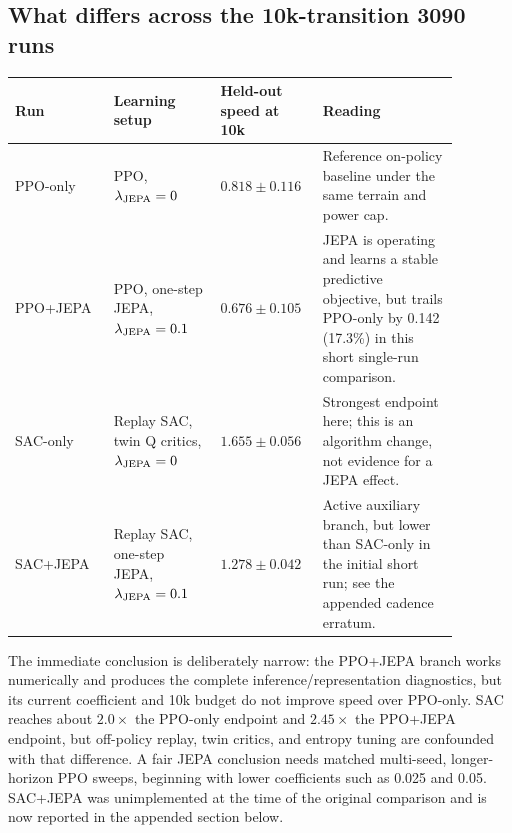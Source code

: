 \documentclass[10pt]{article}
\begin{document}
\subsection{What differs across the 10k-transition 3090 runs}
\begin{center}
\begin{tabular}{>{\raggedright\arraybackslash}p{0.20\linewidth}>{\raggedright\arraybackslash}p{0.22\linewidth}>{\raggedright\arraybackslash}p{0.18\linewidth}>{\raggedright\arraybackslash}p{0.28\linewidth}}
\toprule
\textbf{Run} & \textbf{Learning setup} & \textbf{Held-out speed at 10k} & \textbf{Reading}\tabularnewline
\midrule
PPO-only & PPO, $\lambda_{\rm JEPA}=0$ & $0.818\pm0.116$ & Reference on-policy baseline under the same terrain and power cap.\tabularnewline
PPO+JEPA & PPO, one-step JEPA, $\lambda_{\rm JEPA}=0.1$ & $0.676\pm0.105$ & JEPA is operating and learns a stable predictive objective, but trails PPO-only by 0.142 (17.3\%) in this short single-run comparison.\tabularnewline
SAC-only & Replay SAC, twin Q critics, $\lambda_{\rm JEPA}=0$ & $1.655\pm0.056$ & Strongest endpoint here; this is an algorithm change, not evidence for a JEPA effect.\tabularnewline
SAC+JEPA & Replay SAC, one-step JEPA, $\lambda_{\rm JEPA}=0.1$ & $1.278\pm0.042$ & Active auxiliary branch, but lower than SAC-only in the initial short run; see the appended cadence erratum.\tabularnewline
\bottomrule
\end{tabular}
\end{center}

The immediate conclusion is deliberately narrow: the PPO+JEPA branch works
numerically and produces the complete inference/representation diagnostics,
but its current coefficient and 10k budget do not improve speed over PPO-only.
SAC reaches about $2.0\times$ the PPO-only endpoint and $2.45\times$ the
PPO+JEPA endpoint, but off-policy replay, twin critics, and entropy tuning are
confounded with that difference. A fair JEPA conclusion needs matched
multi-seed, longer-horizon PPO sweeps, beginning with lower coefficients such
as 0.025 and 0.05. SAC+JEPA was unimplemented at the time of the original
comparison and is now reported in the appended section below.
\end{document}
